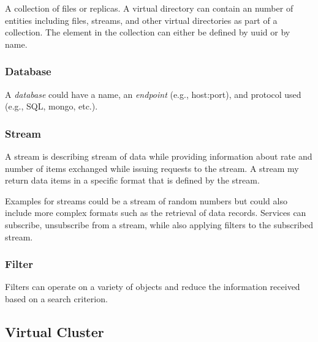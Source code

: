 \documentclass[10pt]{article}
\begin{document}
A collection of files or replicas. A virtual directory can contain an
number of entities including files, streams, and other virtual
directories as part of a collection. The element in the collection can
either be defined by uuid or by name. 


\subsubsection{Database}

A \textit{database} could have a name, an \textit{endpoint} (e.g., host:port),
and protocol used (e.g., SQL, mongo, etc.).


\subsubsection{Stream} 

A stream is describing stream of data while providing information about
rate and number of items exchanged while issuing requests to the
stream. A stream my return data items in a specific format that is
defined by the stream. 


Examples for streams could be a stream of random numbers but could
also include more complex formats such as the retrieval of data
records. Services can subscribe, unsubscribe from a stream, while also
applying filters to the subscribed stream.


\subsubsection{Filter} 

Filters can operate on a variety of objects and reduce the
information received based on a search criterion.



\subsection{Virtual Cluster}\label{S:vc}
\end{document}
